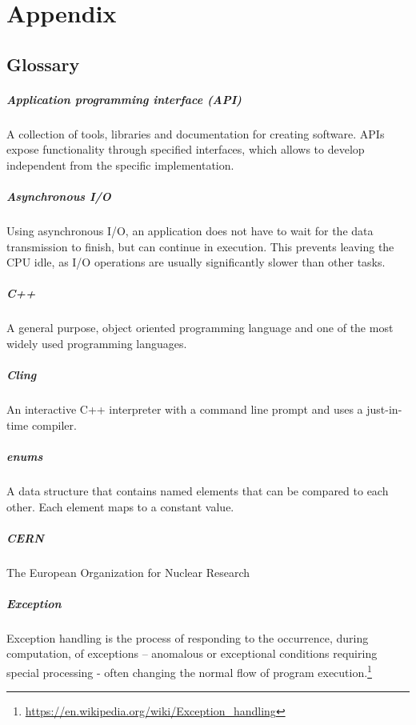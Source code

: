 \chapter{Appendix}
\section{Glossary}
\paragraph{Application programming interface (API)}
A collection of tools, libraries and documentation for creating software. APIs expose functionality through specified interfaces, which allows to develop independent from the specific implementation.
\paragraph{Asynchronous I/O}
Using asynchronous I/O, an application does not have to wait for the data transmission to finish, but can continue in execution. This prevents leaving the CPU idle, as I/O operations are usually significantly slower than other tasks.
\paragraph{C++}
A general purpose, object oriented programming language and one of the most widely used programming languages.

\paragraph{Cling}
An interactive C++ interpreter with a command line prompt and uses a just-in-time compiler.

\paragraph{enums}
A data structure that contains named elements that can be compared to each other. Each element maps to a constant value.

\paragraph{CERN}
The European Organization for Nuclear Research

\paragraph{Exception}
Exception handling is the process of responding to the occurrence, during computation, of exceptions – anomalous or exceptional conditions requiring special processing - often changing the normal flow of program execution.\footnote{\url{https://en.wikipedia.org/wiki/Exception_handling}}

